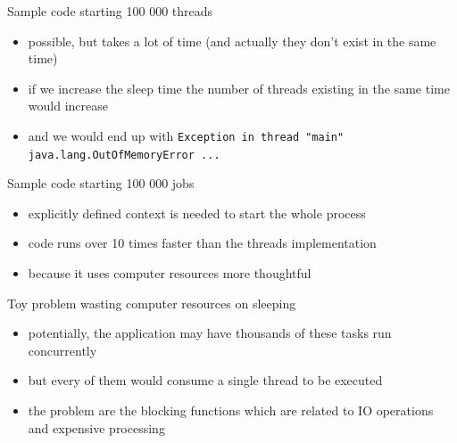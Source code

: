 \documentclass[hyperref={pdfpagelabels=false},xcolor={dvipsnames},compress,onlytextwidth]{beamer}
\begin{document}
    \begin{frame}[fragile]{Sample code starting 100 000 threads}
        \pause
        \begin{itemize}
            \item possible, but takes a lot of time (and actually they don't exist in the same time)\pause
            \item if we increase the sleep time the number of threads existing in the same time would increase\pause
            \item and we would end up with \texttt{Exception in thread "main" java.lang.OutOfMemoryError ...}
        \end{itemize}
    \end{frame}

    \begin{frame}[fragile]{Sample code starting 100 000 jobs}
        \pause
        \begin{itemize}
            \item explicitly defined context is needed to start the whole process\pause
            \item code runs over 10 times faster than the threads implementation\pause
            \item because it uses computer resources more thoughtful
        \end{itemize}
    \end{frame}

    \begin{frame}[fragile]{Toy problem wasting computer resources on sleeping}
        \pause
        \begin{itemize}
            \item potentially, the application may have thousands of these tasks run concurrently\pause
            \item but every of them would consume a single thread to be executed\pause
            \item the problem are the blocking functions which are related to IO operations and expensive processing
        \end{itemize}
    \end{frame}
\end{document}
